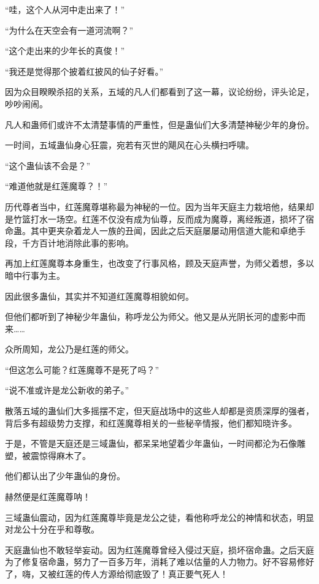 
\begin{this_body}



“哇，这个人从河中走出来了！”

“为什么在天空会有一道河流啊？”

“这个走出来的少年长的真俊！”

“我还是觉得那个披着红披风的仙子好看。”

因为众目睽睽杀招的关系，五域的凡人们都看到了这一幕，议论纷纷，评头论足，吵吵闹闹。

凡人和蛊师们或许不太清楚事情的严重性，但是蛊仙们大多清楚神秘少年的身份。

一时间，五域蛊仙身心狂震，宛若有灭世的飓风在心头横扫呼啸。

“这个蛊仙该不会是？”

“难道他就是红莲魔尊？！”

历代尊者当中，红莲魔尊堪称最为神秘的一位。因为当年天庭主力栽培他，结果却是竹篮打水一场空。红莲不仅没有成为仙尊，反而成为魔尊，离经叛道，损坏了宿命蛊。其中更夹杂着龙人一族的丑闻，因此之后天庭屡屡动用信道大能和卓绝手段，千方百计地消除此事的影响。

再加上红莲魔尊本身重生，也改变了行事风格，顾及天庭声誉，为师父着想，多以暗中行事为主。

因此很多蛊仙，其实并不知道红莲魔尊相貌如何。

但他们都听到了神秘少年蛊仙，称呼龙公为师父。他又是从光阴长河的虚影中而来……

众所周知，龙公乃是红莲的师父。

“但这怎么可能？红莲魔尊不是死了吗？”

“说不准或许是龙公新收的弟子。”

散落五域的蛊仙们大多摇摆不定，但天庭战场中的这些人却都是资质深厚的强者，背后多有超级势力支撑，和红莲魔尊相关的一些秘辛情报，他们都知晓许多。

于是，不管是天庭还是三域蛊仙，都呆呆地望着少年蛊仙，一时间都沦为石像雕塑，被震惊得麻木了。

他们都认出了少年蛊仙的身份。

赫然便是红莲魔尊呐！

三域蛊仙震动，因为红莲魔尊毕竟是龙公之徒，看他称呼龙公的神情和状态，明显对龙公十分在乎和尊敬。

天庭蛊仙也不敢轻举妄动。因为红莲魔尊曾经入侵过天庭，损坏宿命蛊。之后天庭为了修复宿命蛊，努力了一百多万年，消耗了难以估量的人力物力。好不容易修好了，嗨，又被红莲的传人方源给彻底毁了！真正要气死人！


\end{this_body}

